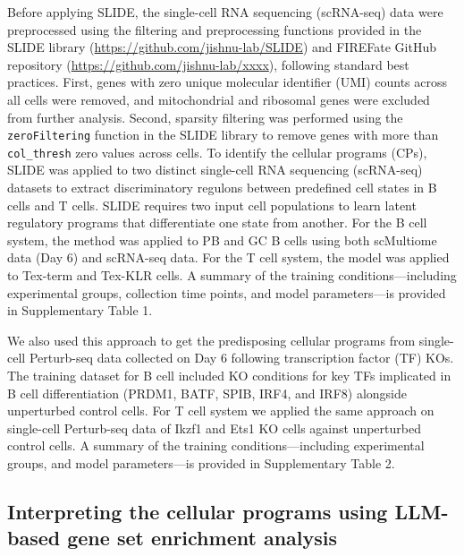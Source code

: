 \documentclass[11pt]{article}
\begin{document}
Before applying SLIDE, the single-cell RNA sequencing (scRNA-seq) data were
preprocessed using the filtering and preprocessing functions provided in the SLIDE
library (\url{https://github.com/jishnu-lab/SLIDE}) and FIREFate GitHub repository
(\url{https://github.com/jishnu-lab/xxxx}), following standard best practices. First,
genes with zero unique molecular identifier (UMI) counts across all cells were removed,
and mitochondrial and ribosomal genes were excluded from further analysis. Second,
sparsity filtering was performed using the \texttt{zeroFiltering} function in the SLIDE
library to remove genes with more than \texttt{col\_thresh} zero values across cells.
To identify the cellular programs (CPs), SLIDE was applied to two distinct single-cell
RNA sequencing (scRNA-seq) datasets to extract discriminatory regulons between
predefined cell states in B cells and T cells. SLIDE requires two input cell populations
to learn latent regulatory programs that differentiate one state from another. For the
B cell system, the method was applied to PB and GC B cells using both scMultiome data
(Day 6) and scRNA-seq data. For the T cell system, the model was applied to Tex-term
and Tex-KLR cells. A summary of the training conditions---including experimental groups,
collection time points, and model parameters---is provided in Supplementary Table 1.

We also used this approach to get the predisposing cellular programs from single-cell
Perturb-seq data collected on Day 6 following transcription factor (TF) KOs. The
training dataset for B cell included KO conditions for key TFs implicated in B cell
differentiation (PRDM1, BATF, SPIB, IRF4, and IRF8) alongside unperturbed control cells.
For T cell system we applied the same approach on single-cell Perturb-seq data of Ikzf1
and Ets1 KO cells against unperturbed control cells. A summary of the training
conditions---including experimental groups, and model parameters---is provided in
Supplementary Table 2.

\subsection*{Interpreting the cellular programs using LLM-based gene set enrichment analysis}
\end{document}
